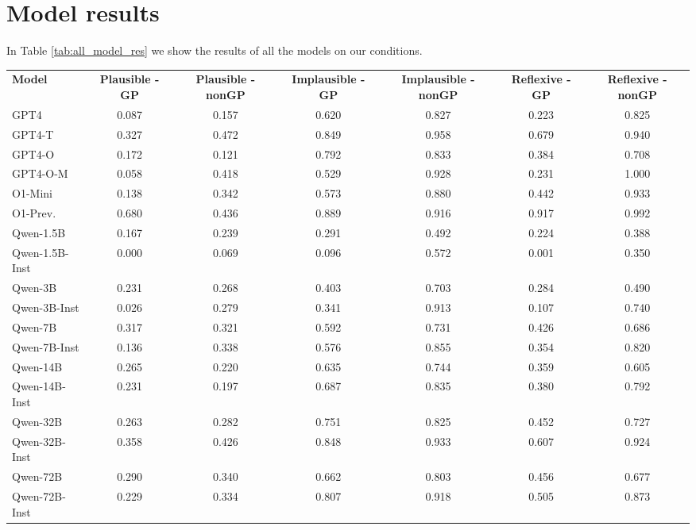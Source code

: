 \section{Model results}
\label{sec:all_model_res}

In Table \ref{tab:all_model_res} we show the results of all the models on our conditions.

\begin{table*}[t!]
    \scriptsize 
    \centering
        \begin{tabular}{ l | c c c c c c }
         \textbf{Model} & \textbf{Plausible - GP} & \textbf{Plausible - nonGP} & \textbf{Implausible - GP} & \textbf{Implausible - nonGP} & \textbf{Reflexive - GP} & \textbf{Reflexive - nonGP} \\
        \thickhline
GPT4 & 0.087 & 0.157 & 0.620 & 0.827 & 0.223 & 0.825 \\ 
GPT4-T & 0.327 & 0.472 & 0.849 & 0.958 & 0.679 & 0.940 \\ 
GPT4-O & 0.172 & 0.121 & 0.792 & 0.833 & 0.384 & 0.708 \\ 
GPT4-O-M & 0.058 & 0.418 & 0.529 & 0.928 & 0.231 & 1.000 \\ 
O1-Mini & 0.138 & 0.342 & 0.573 & 0.880 & 0.442 & 0.933 \\ 
O1-Prev. & 0.680 & 0.436 & 0.889 & 0.916 & 0.917 & 0.992 \\ \hline
Qwen-1.5B & 0.167 & 0.239 & 0.291 & 0.492 & 0.224 & 0.388 \\ 
Qwen-1.5B-Inst & 0.000 & 0.069 & 0.096 & 0.572 & 0.001 & 0.350 \\ 
Qwen-3B & 0.231 & 0.268 & 0.403 & 0.703 & 0.284 & 0.490 \\ 
Qwen-3B-Inst & 0.026 & 0.279 & 0.341 & 0.913 & 0.107 & 0.740 \\
Qwen-7B & 0.317 & 0.321 & 0.592 & 0.731 & 0.426 & 0.686 \\ 
Qwen-7B-Inst & 0.136 & 0.338 & 0.576 & 0.855 & 0.354 & 0.820 \\ 
Qwen-14B & 0.265 & 0.220 & 0.635 & 0.744 & 0.359 & 0.605 \\ 
Qwen-14B-Inst & 0.231 & 0.197 & 0.687 & 0.835 & 0.380 & 0.792 \\ 
Qwen-32B & 0.263 & 0.282 & 0.751 & 0.825 & 0.452 & 0.727 \\ 
Qwen-32B-Inst & 0.358 & 0.426 & 0.848 & 0.933 & 0.607 & 0.924 \\  
Qwen-72B & 0.290 & 0.340 & 0.662 & 0.803 & 0.456 & 0.677 \\ 
Qwen-72B-Inst & 0.229 & 0.334 & 0.807 & 0.918 & 0.505 & 0.873 \\ \hline

\end{tabular}
\end{table*}
